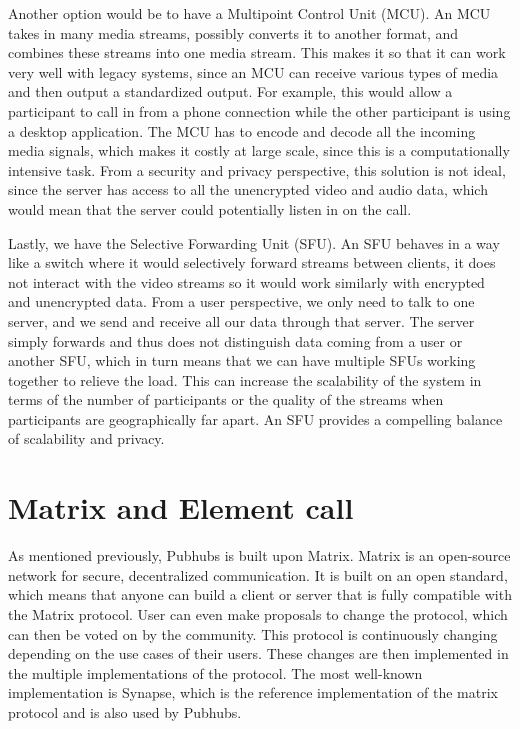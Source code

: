 \documentclass{report}
\begin{document}
Another option would be to have a Multipoint Control Unit (MCU). An MCU takes in many media streams, possibly
converts it to another format, and combines these streams into one media stream. This makes it so that it can work
very well with legacy systems, since an MCU can receive various types of media and then output a standardized
output. For example, this would allow a participant to call in from a phone connection while the other participant
is using a desktop application. The MCU has to encode and decode all the incoming media signals, which makes it
costly at large scale, since this is a computationally intensive task. From a security and privacy perspective, this
solution is not ideal, since the server has access to all the unencrypted video and audio data, which would mean that
the server could potentially listen in on the call.

Lastly, we have the Selective Forwarding Unit (SFU). An SFU behaves in a way like a switch where it would
selectively forward streams between clients, it does not interact with the video streams so it would work similarly
with encrypted and unencrypted data. From a user perspective, we only need to talk to one server, and we send and
receive all our data through that server. The server simply forwards and thus does not distinguish data coming from
a user or another SFU, which in turn means that we can have multiple SFUs working together to relieve the load. This
can increase the scalability of the system in terms of the number of participants or the quality of the streams when
participants are geographically far apart. An SFU provides a compelling balance of scalability and privacy.

\section{Matrix and Element call}
As mentioned previously, Pubhubs is built upon Matrix. Matrix is an open-source network for secure, decentralized
communication. It is built on an open standard, which means that anyone can build a client or server that is fully
compatible with the Matrix protocol. User can even make proposals to change the protocol, which can then be voted on
by the community. This protocol is continuously changing depending on the use cases of their users. These changes
are then implemented in the multiple implementations of the protocol. The most well-known implementation is Synapse,
which is the reference implementation of the matrix protocol and is also used by Pubhubs.
\end{document}
